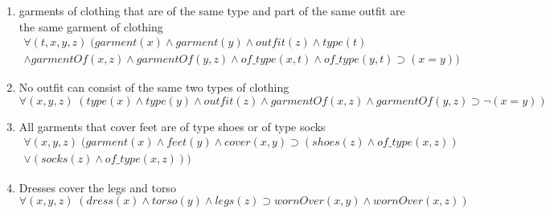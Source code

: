 \documentclass[paper=a4, fontsize=11pt]{scrartcl} %
\numberwithin{equation}{section} %
\numberwithin{figure}{section} %
\numberwithin{table}{section} %
\begin{document}
\begin{enumerate}
\item garments of clothing that are of the same type and part of the same outfit are the same garment of clothing 
\begin{equation*}
	\begin{split}
	\forall(t,x,y,z) \; (garment(x) \land garment (y) \land outfit(z) \land type(t) \\
	\land garmentOf(x,z) \land garmentOf(y,z) \land of\_type(x,t) \land of\_type(y,t) \supset (x=y))
	\end{split}
\end{equation*}

\item No outfit can consist of the same two types of clothing
\begin{equation*}
	\forall(x,y,z) \; (type(x) \land type(y) \land outfit(z) \land garmentOf(x,z) \land garmentOf(y,z) \supset \lnot(x=y))
\end{equation*}


\item All garments that cover feet are of type shoes or of type socks
\begin{equation*}
	\begin{split}
	\forall(x,y,z) \; (garment(x) \land feet(y) \land cover(x,y) \supset (shoes(z) \land of\_type(x,z)) \\ \lor (socks(z) \land of\_type(x,z)))
	\end{split}
\end{equation*}



\item Dresses cover the legs and torso
\begin{equation*}
	\forall(x,y,z) \; (dress(x) \land torso(y) \land legs(z) \supset wornOver(x,y) \land wornOver(x,z))
\end{equation*}


\end{enumerate}
\end{document}
